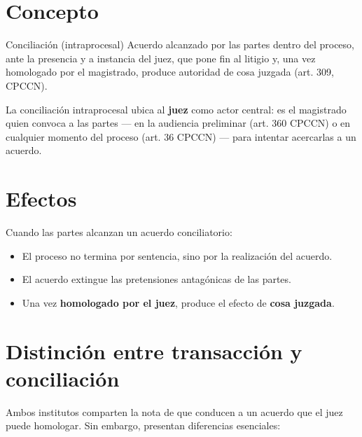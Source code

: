 \documentclass[12pt,oneside]{book}
\begin{document}
\section{Concepto}

\begin{definition}{Conciliación (intraprocesal)}
Acuerdo alcanzado por las partes dentro del proceso, ante la presencia y a instancia del juez, que pone fin al litigio y, una vez homologado por el magistrado, produce autoridad de cosa juzgada (art. 309, CPCCN).
\end{definition}

La conciliación intraprocesal ubica al \textbf{juez} como actor central: es el magistrado quien convoca a las partes --- en la audiencia preliminar (art. 360 CPCCN) o en cualquier momento del proceso (art. 36 CPCCN) --- para intentar acercarlas a un acuerdo.

\section{Efectos}

Cuando las partes alcanzan un acuerdo conciliatorio:

\begin{itemize}
    \item El proceso no termina por sentencia, sino por la realización del acuerdo.
    \item El acuerdo extingue las pretensiones antagónicas de las partes.
    \item Una vez \textbf{homologado por el juez}, produce el efecto de \textbf{cosa juzgada}.
\end{itemize}

\section{Distinción entre transacción y conciliación}

Ambos institutos comparten la nota de que conducen a un acuerdo que el juez puede homologar. Sin embargo, presentan diferencias esenciales:
\end{document}
